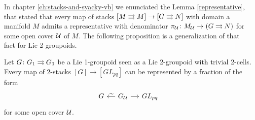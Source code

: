 %
%

In chapter \ref{ch:stacks-and-syacky-vb} we enunciated the Lemma \ref{representative}, that stated that every map of stacks $[M\rightrightarrows M]\to [G\rightrightarrows N]$ with domain a manifold $M$ admits a representative with denominator \( \pi_{\mathcal{U}}\colon M_{\mathcal{U}} \to (G\rightrightarrows N) \) for some open cover $\mathcal{U}$ of $M$.
The following proposition is a generalization of that fact for Lie 2-groupoids.

\begin{prop}
Let $G\colon G_1\rightrightarrows G_0$ be a Lie 1-groupoid seen as a Lie 2-groupoid with trivial 2-cells.
Every map of 2-stacks $[G]\to [GL_{pq}]$ can be represented by a fraction of the form
\begin{equation}
\begin{tikzcd}[sep = small]
  G & G_\U \ar{l}[pos=.45, above]{\sim} \ar{r} & GL_{pq}
\end{tikzcd}
\end{equation}
for some open cover $\mathcal{U}$.
\end{prop}

